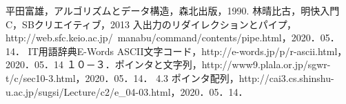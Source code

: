 \begin{thebibliography}{99}
   平田富雄，アルゴリズムとデータ構造，森北出版，1990.
   林晴比古，明快入門C，SBクリエイティブ，2013
   入出力のリダイレクションとパイプ，http://web.sfc.keio.ac.jp/~manabu/command/contents/pipe.html，2020．05．14．
   IT用語辞典E-Words ASCII文字コード，http://e-words.jp/p/r-ascii.html，2020．05．14
   １０－３．ポインタと文字列，http://www9.plala.or.jp/sgwr-t/c/sec10-3.html，2020．05．14．
   4.3 ポインタ配列，http://cai3.cs.shinshu-u.ac.jp/sugsi/Lecture/c2/e\_04-03.html，2020．05．14．%
\end{thebibliography}


